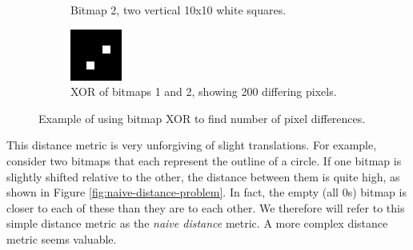 \documentclass[12pt]{article}
\begin{document}
\begin{figure}
\begin{subfigure}[b]{.3\linewidth}
\caption{Bitmap 2, two vertical 10x10 white squares.}
\label{fig:squares-vertical}
\end{subfigure}
\hspace{2mm}
\begin{subfigure}[b]{.3\linewidth}
\includegraphics[width=\linewidth]{squares-diagonal.png}
\caption{XOR of bitmaps 1 and 2, showing 200 differing pixels.}
\label{fig:squares-diagonal}
\end{subfigure}
\caption{Example of using bitmap XOR to find number of pixel differences.}
\label{fig:naive-distance}
\end{figure}

This distance metric is very unforgiving of slight translations.  For example, consider two bitmaps that each represent the outline of a circle.  If one bitmap is slightly shifted relative to the other, the distance between them is quite high, as shown in Figure \ref{fig:naive-distance-problem}.  In fact, the empty (all 0s) bitmap is closer to each of these than they are to each other.  We therefore will refer to this simple distance metric as the \textit{naive distance} metric. A more complex distance metric seems valuable.
\end{document}
